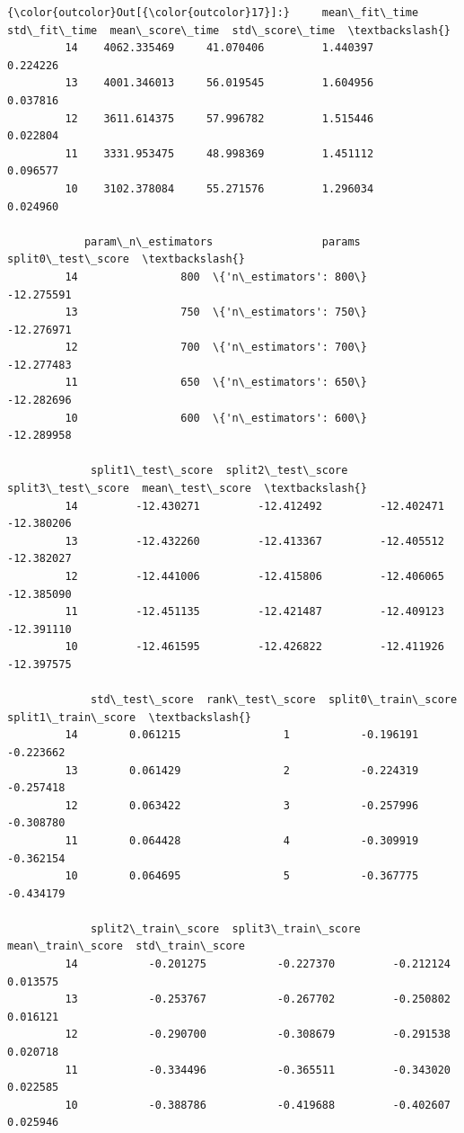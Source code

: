 \documentclass[11pt]{article}
\begin{document}
\begin{Verbatim}[commandchars=\\\{\}]
{\color{outcolor}Out[{\color{outcolor}17}]:}     mean\_fit\_time  std\_fit\_time  mean\_score\_time  std\_score\_time  \textbackslash{}
         14    4062.335469     41.070406         1.440397        0.224226   
         13    4001.346013     56.019545         1.604956        0.037816   
         12    3611.614375     57.996782         1.515446        0.022804   
         11    3331.953475     48.998369         1.451112        0.096577   
         10    3102.378084     55.271576         1.296034        0.024960   
         
            param\_n\_estimators                 params  split0\_test\_score  \textbackslash{}
         14                800  \{'n\_estimators': 800\}         -12.275591   
         13                750  \{'n\_estimators': 750\}         -12.276971   
         12                700  \{'n\_estimators': 700\}         -12.277483   
         11                650  \{'n\_estimators': 650\}         -12.282696   
         10                600  \{'n\_estimators': 600\}         -12.289958   
         
             split1\_test\_score  split2\_test\_score  split3\_test\_score  mean\_test\_score  \textbackslash{}
         14         -12.430271         -12.412492         -12.402471       -12.380206   
         13         -12.432260         -12.413367         -12.405512       -12.382027   
         12         -12.441006         -12.415806         -12.406065       -12.385090   
         11         -12.451135         -12.421487         -12.409123       -12.391110   
         10         -12.461595         -12.426822         -12.411926       -12.397575   
         
             std\_test\_score  rank\_test\_score  split0\_train\_score  split1\_train\_score  \textbackslash{}
         14        0.061215                1           -0.196191           -0.223662   
         13        0.061429                2           -0.224319           -0.257418   
         12        0.063422                3           -0.257996           -0.308780   
         11        0.064428                4           -0.309919           -0.362154   
         10        0.064695                5           -0.367775           -0.434179   
         
             split2\_train\_score  split3\_train\_score  mean\_train\_score  std\_train\_score  
         14           -0.201275           -0.227370         -0.212124         0.013575  
         13           -0.253767           -0.267702         -0.250802         0.016121  
         12           -0.290700           -0.308679         -0.291538         0.020718  
         11           -0.334496           -0.365511         -0.343020         0.022585  
         10           -0.388786           -0.419688         -0.402607         0.025946  
\end{Verbatim}
            
\end{document}
